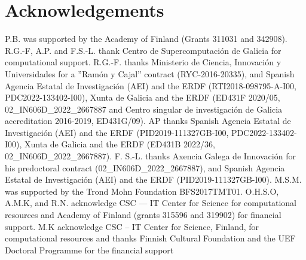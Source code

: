 \documentclass[fleqn,10pt]{wlscirep}
\begin{document}








\section*{Acknowledgements}

P.B. was supported by the Academy of Finland (Grants 311031 and 342908).
R.G.-F, A.P. and F.S.-L. thank Centro de Supercomputación de Galicia for computational support.
R.G.-F. thanks Ministerio de Ciencia, Innovaci{\'o}n y Universidades for a ''Ram{\'o}n y Cajal'' contract (RYC-2016-20335), and Spanish Agencia Estatal de Investigaci{\'o}n (AEI) and the ERDF (RTI2018-098795-A-I00, PDC2022-133402-I00), Xunta de Galicia and the ERDF (ED431F 2020/05, 02\_IN606D\_2022\_2667887 and Centro singular de investigaci{\'o}n de Galicia accreditation 2016-2019, ED431G/09). 
AP thanks Spanish Agencia Estatal de Investigaci{\'o}n (AEI) and the ERDF (PID2019-111327GB-I00, PDC2022-133402-I00), Xunta de Galicia and the ERDF (ED431B 2022/36, 02\_IN606D\_2022\_2667887).
F. S.-L. thanks Axencia Galega de Innovaci{\'o}n for his predoctoral contract (02\_IN606D\_2022\_2667887), and Spanish Agencia Estatal de Investigaci{\'o}n (AEI) and the ERDF (PID2019-111327GB-I00). 
M.S.M. was supported by the Trond Mohn Foundation BFS2017TMT01.
O.H.S.O, A.M.K, and R.N. acknowledge CSC --- IT Center for Science for computational resources and Academy of Finland (grants 315596 and 319902) for financial support.
M.K acknowledge CSC – IT Center for Science, Finland, for computational resources and thanks Finnish Cultural Foundation and the UEF Doctoral Programme for the financial support
\end{document}
